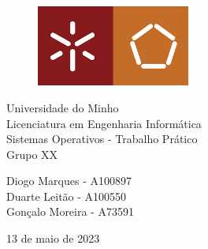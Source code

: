 \begin{titlepage}
    \centering
    \fontsize{25}{0}\selectfont
    
    \begin{figure}
        \centering
        \includegraphics[width=0.45\textwidth]{images/uminho.png}
        \caption*{}
        \label{fig:my_label}
    \end{figure}

    Universidade do Minho \\
    \Large Licenciatura em Engenharia Informática \\
    
    \vspace*{4.3cm}
    \Large Sistemas Operativos - Trabalho Prático \\ 
    \large Grupo XX

    \vspace*{4.3cm}
    
    \large Diogo Marques - A100897 \\
    \large Duarte Leitão - A100550 \\
    \large Gonçalo Moreira - A73591 \\

    \vspace*{1cm}

    \large 13 de maio de 2023
\end{titlepage}
